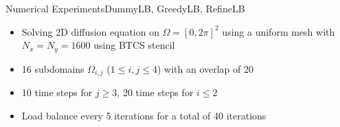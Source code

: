 \documentclass[]{beamer}
\begin{document}




\begin{frame}{Numerical Experiments}{DummyLB, GreedyLB, RefineLB}
  
  \begin{itemize}
  \item Solving 2D diffusion equation on $\Omega = [0,2\pi]^2$ using a
    uniform mesh with $N_x = N_y = 1600$ using BTCS stencil
  \item 16 subdomains $\Omega_{i,j}$ ($1\leq i,j \leq 4$) with an
    overlap of 20
  \item 10 time steps for $j\geq3$, 20 time steps for $i\leq2$
  \item Load balance every 5 iterations for a total of 40 iterations
  \end{itemize}
\end{frame}
\end{document}
